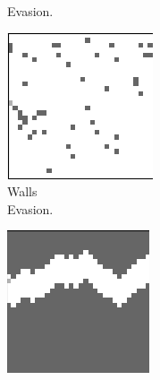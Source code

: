 \begin{figure}[ht!]
\begin{subfigure}{0.24\columnwidth}
		\caption{Evasion.}
		\label{subfig:evasion}
	\end{subfigure}
	\centering
	\begin{subfigure}{0.24\columnwidth}
		\centering
		\includegraphics[width=\linewidth]{documentation/report/img/evasion.png}
		\caption{Walls \\ Evasion.}
		\label{subfig:wall_evasion}
	\end{subfigure}%
	\begin{subfigure}{0.24\columnwidth}
		\centering
		\includegraphics[width=\linewidth]{documentation/report/img/tunnel.png}

\end{subfigure}
\end{figure}
